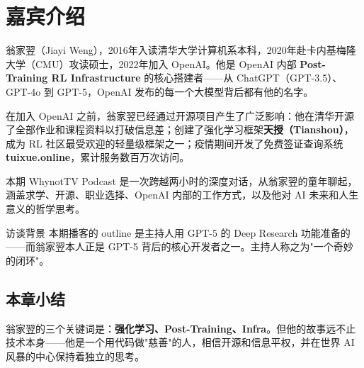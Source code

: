 \section{嘉宾介绍}

翁家翌（Jiayi Weng），2016年入读清华大学计算机系本科，2020年赴卡内基梅隆大学（CMU）攻读硕士，2022年加入 OpenAI。他是 OpenAI 内部 \textbf{Post-Training RL Infrastructure} 的核心搭建者——从 ChatGPT（GPT-3.5）、GPT-4o 到 GPT-5，OpenAI 发布的每一个大模型背后都有他的名字。

在加入 OpenAI 之前，翁家翌已经通过开源项目产生了广泛影响：他在清华开源了全部作业和课程资料以打破信息差；创建了强化学习框架\textbf{天授（Tianshou）}，成为 RL 社区最受欢迎的轻量级框架之一；疫情期间开发了免费签证查询系统 \textbf{tuixue.online}，累计服务数百万次访问。

本期 WhynotTV Podcast 是一次跨越两小时的深度对话，从翁家翌的童年聊起，涵盖求学、开源、职业选择、OpenAI 内部的工作方式，以及他对 AI 未来和人生意义的哲学思考。

\begin{knowledgebox}{访谈背景}
本期播客的 outline 是主持人用 GPT-5 的 Deep Research 功能准备的——而翁家翌本人正是 GPT-5 背后的核心开发者之一。主持人称之为"一个奇妙的闭环"。
\end{knowledgebox}

\subsection{本章小结}

翁家翌的三个关键词是：\textbf{强化学习、Post-Training、Infra}。但他的故事远不止技术本身——他是一个用代码做"慈善"的人，相信开源和信息平权，并在世界 AI 风暴的中心保持着独立的思考。


